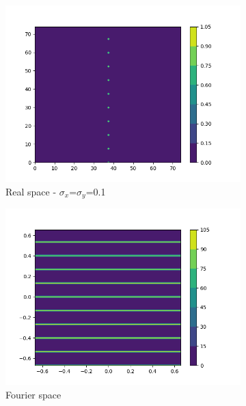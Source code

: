 \documentclass{article}
\begin{document}
\begin{figure}[h]
	\begin{subfigure}{0.45\textwidth}
                \centering
                \includegraphics[width=\textwidth]{real_2d_74_1column.png}
                \caption{Real space - $\sigma_x$=$\sigma_y$=0.1}\label{fig:real_2d_74_1column}
        \end{subfigure}
        \begin{subfigure}{0.45\textwidth}
                \centering
                \includegraphics[width=\textwidth]{fourier_2d_74_1column.png}
                \caption{Fourier space}\label{fig:fourier_2d_74_1column}
        \end{subfigure}
	\begin{subfigure}{0.45\textwidth}

\end{subfigure}
\end{figure}
\end{document}
